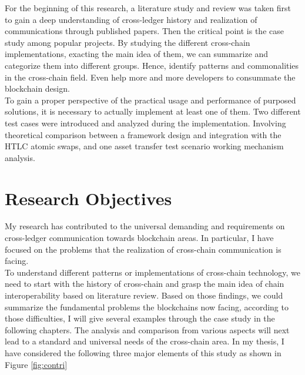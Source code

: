 \noindent For the beginning of this research, a literature study and review was taken first to gain a deep understanding of cross-ledger history and realization of communications through published papers. Then the critical point is the case study among popular projects. By studying the different cross-chain implementations, exacting the main idea of them, we can summarize and categorize them into different groups. Hence, identify patterns and commonalities in the cross-chain field. Even help more and more developers to consummate the blockchain design.\\

\noindent To gain a proper perspective of the practical usage and performance of purposed solutions, it is necessary to actually implement at least one of them. Two different test cases were introduced and analyzed during the implementation. Involving theoretical comparison between a framework design and integration with the HTLC atomic swaps, and one asset transfer test scenario working mechanism analysis.  
         
\section{Research Objectives}
\label{sec:ro}
\noindent My research has contributed to the universal demanding and requirements on cross-ledger communication towards blockchain areas. In particular, I have focused on the problems that the realization of cross-chain communication is facing.\\

\noindent To understand different patterns or implementations of cross-chain technology, we need to start with the history of cross-chain and grasp the main idea of chain interoperability based on literature review. Based on those findings, we could summarize the fundamental problems the blockchains now facing, according to those difficulties, I will give several examples through the case study in the following chapters.  The analysis and comparison from various aspects will next lead to a standard and universal needs of the cross-chain area. In my thesis, I have considered the following three major elements of this study as shown in Figure \ref{fig:contri}

